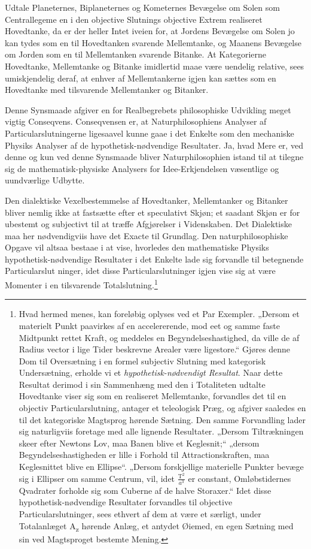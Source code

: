 \documentclass[12pt]{book}
\newcommand{\opage}[1]{\marginnote{\footnotesize\textit{[#1]}}}
\begin{document}
Udtale Planeternes, Biplaneternes og Kometernes Bevægelse om Solen som Centrallegeme en i den objective Slutnings objective Extrem realiseret Hovedtanke, da er der heller Intet iveien for, at Jordens Bevægelse om Solen jo kan tydes som en til Hovedtanken svarende Mellemtanke, og Maanens Bevægelse om Jorden som en til Mellemtanken svarende Bitanke. At Kategorierne Hovedtanke, Mellemtanke og Bitanke imidlertid maae være uendelig relative, sees umiskjendelig deraf, at enhver af Mellemtankerne igjen kan sættes som en Hovedtanke med tilsvarende Mellemtanker og Bitanker.

Denne Synsmaade afgiver en for Realbegrebets philosophiske Udvikling meget vigtig Conseqvens. Conseqvensen er, at Naturphilosophiens Analyser af Particularslutningerne ligesaavel kunne gaae i det Enkelte som den mechaniske Physiks Analyser af de hypothetisk-nødvendige Resultater. Ja, hvad Mere er, ved denne og kun ved denne Synsmaade bliver Naturphilosophien istand til at tilegne sig de mathematisk-physiske Analysers for Idee-Erkjendelsen væsentlige og uundværlige Udbytte.

Den dialektiske Vexelbestemmelse af Hovedtanker, Mellemtanker og Bitanker bliver nemlig ikke at fastsætte efter et speculativt Skjøn; et saadant Skjøn er for ubestemt og subjectivt til at træffe Afgjørelser i Videnskaben. Det Dialektiske maa her nødvendigviis have det Exacte til Grundlag. Den naturphilosophiske Opgave vil altsaa bestaae i at vise, hvorledes den mathematiske Physiks hypothetisk-nødvendige Resultater i det Enkelte lade sig forvandle til betegnende Particularslut%
\opage{429}ninger, idet disse Particularslutninger igjen vise sig at være Momenter i en tilsvarende Totalslutning.\footnote{Hvad hermed menes, kan foreløbig oplyses ved et Par Exempler. „Dersom et materielt Punkt paavirkes af en accelererende, mod eet og samme faste Midtpunkt rettet Kraft, og meddeles en Begyndelseshastighed, da ville de af Radius vector i lige Tider beskrevne Arealer være ligestore.“ Gjøres denne Dom til Oversætning i en formel subjectiv Slutning med kategorisk Undersætning, erholde vi et \emph{hypothetisk-nødvendigt Resultat}. Naar dette Resultat derimod i sin Sammenhæng med den i Totaliteten udtalte Hovedtanke viser sig som en realiseret Mellemtanke, forvandles det til en objectiv Particularslutning, antager et teleologisk Præg, og afgiver saaledes en til det kategoriske Magtsprog hørende Sætning. Den samme Forvandling lader sig naturligviis foretage med alle lignende Resultater. „Dersom Tiltrækningen skeer efter Newtons Lov, maa Banen blive et Keglesnit;“ „dersom Begyndelseshastigheden er lille i Forhold til Attractionskraften, maa Keglesnittet blive en Ellipse“. „Dersom forskjellige materielle Punkter bevæge sig i Ellipser om samme Centrum, vil, idet $\frac{\mathrm{T}^2}{a^3}$ er constant, Omløbstidernes Qvadrater forholde sig som Cuberne af de halve Storaxer.“ Idet disse hypothetisk-nødvendige Resultater forvandles til objective Particularslutninger, sees ethvert af dem at være et særligt, under Totalanlæget A\textsubscript{z} %
hørende Anlæg, et antydet Øiemed, en egen Sætning med sin ved Magtsproget bestemte Mening.}%
\end{document}
